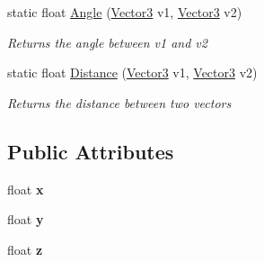 \begin{DoxyCompactItemize}
\item 
static float \hyperlink{struct_engine_1_1_vector3_aec479c2d3e56730a4fc6ec94ad96a7c8}{Angle} (\hyperlink{struct_engine_1_1_vector3}{Vector3} v1, \hyperlink{struct_engine_1_1_vector3}{Vector3} v2)
\begin{DoxyCompactList}\small\item\em Returns the angle between v1 and v2 \end{DoxyCompactList}\item 
static float \hyperlink{struct_engine_1_1_vector3_aa4ac368cce1c0b5c4b2659da5da98774}{Distance} (\hyperlink{struct_engine_1_1_vector3}{Vector3} v1, \hyperlink{struct_engine_1_1_vector3}{Vector3} v2)
\begin{DoxyCompactList}\small\item\em Returns the distance between two vectors \end{DoxyCompactList}\end{DoxyCompactItemize}
\subsection*{Public Attributes}
\begin{DoxyCompactItemize}
\item 
\hypertarget{struct_engine_1_1_vector3_a2d0567bf09b7a6c1367817c6d8ab0721}{float {\bfseries x}}\label{struct_engine_1_1_vector3_a2d0567bf09b7a6c1367817c6d8ab0721}

\item 
\hypertarget{struct_engine_1_1_vector3_a2d38bbe685b5e22f8f35f1a2dfa9b950}{float {\bfseries y}}\label{struct_engine_1_1_vector3_a2d38bbe685b5e22f8f35f1a2dfa9b950}

\item 
\hypertarget{struct_engine_1_1_vector3_ab68cc4af3403e161bfaf8df15bd4ad81}{float {\bfseries z}}\label{struct_engine_1_1_vector3_ab68cc4af3403e161bfaf8df15bd4ad81}

\end{DoxyCompactItemize}
